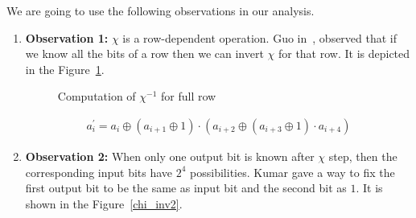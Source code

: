 
We are going to use the following observations in our analysis.
\begin{enumerate}
\item \label{ob1}\textbf{Observation 1:} $\chi$ is a row-dependent operation. Guo \etal in~\cite{guo2016linear}, observed that if we know all the bits of a row then we can invert $\chi$ for that row. It is depicted in the Figure~\ref{chi_inv}.
\begin{figure}
\begin{center}
\end{center}
\caption{Computation of $\chi^{-1}$ for full row \label{chi_inv}}
\end{figure}
\begin{align}
a_i^\prime = a_i \oplus \left( a_{i+1} \oplus 1\right) \cdot \left( a_{i+2} \oplus \left( a_{i+3} \oplus 1 \right) \cdot a_{i+4}\right)
\end{align}


\item \label{ob2}\textbf{Observation 2:} When only one output bit is known after $\chi$ step, then the corresponding input bits have $2^4$ possibilities. Kumar \etal\cite{kumar2018cryptanalysis} gave a way to fix the first output bit to be the same as input bit and the second bit as $1$. It is shown in the Figure~\ref{chi_inv2}.

\begin{figure}[ht]
\begin{center}
\end{center}
\end{figure}
\end{enumerate}
